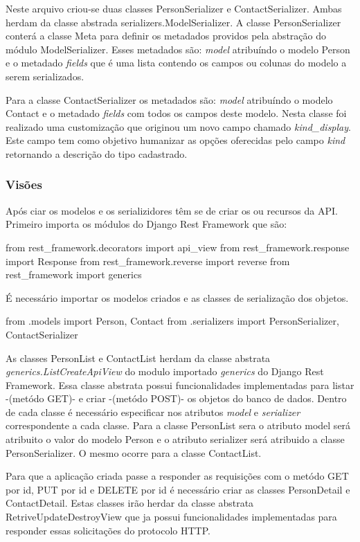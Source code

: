   Neste arquivo criou-se duas classes PersonSerializer e ContactSerializer. Ambas herdam da classe abstrada serializers.ModelSerializer.
  A classe PersonSerializer conterá a classe Meta para definir os metadados providos pela abstração do módulo ModelSerializer. Esses 
  metadados são: \textit{model} atribuíndo o modelo Person e o metadado \textit{fields} que é uma lista contendo os campos ou colunas
  do modelo a serem serializados.
  
  Para a classe ContactSerializer os metadados são: \textit{model} atribuíndo o modelo Contact e o metadado \textit{fields} com todos os
  campos deste modelo. Nesta classe foi realizado uma customização que originou um novo campo chamado \textit{kind_display}. Este campo
  tem como objetivo humanizar as opções oferecidas pelo campo \textit{kind} retornando a descrição do tipo cadastrado.

\subsubsection{Visões}

  Após ciar os modelos e os serializidores têm se de criar os  ou recursos da API. Primeiro importa os módulos
  do Django Rest Framework que são:
    
  from rest_framework.decorators import api_view
  from rest_framework.response import Response
  from rest_framework.reverse import reverse
  from rest_framework import generics
  
  É necessário importar os modelos criados e as classes de serialização dos objetos.
  
  from .models import Person, Contact 
  from .serializers import PersonSerializer, ContactSerializer
  
  As classes PersonList e ContactList herdam da classe abstrata \textit{generics.ListCreateApiView} do modulo
  importado \textit{generics} do Django Rest Framework. Essa classe abstrata possui funcionalidades implementadas para 
  listar -(metódo GET)- e criar -(metódo POST)- os objetos do banco de dados. Dentro de cada classe é necessário especificar
  nos atributos \textit{model} e \textit{serializer} correspondente a cada classe. Para a classe PersonList sera o atributo
  model será atribuito o valor do modelo Person e o atributo serializer será atribuido a classe PersonSerializer. O mesmo ocorre para 
  a classe ContactList.
  
  Para que a aplicação criada passe a responder as requisições com o metódo GET por id, PUT por id e DELETE por id é necessário criar
  as classes PersonDetail e ContactDetail. Estas classes irão herdar da classe abstrata RetriveUpdateDestroyView que ja possui 
  funcionalidades implementadas para responder essas solicitações do protocolo \ac{HTTP}.

